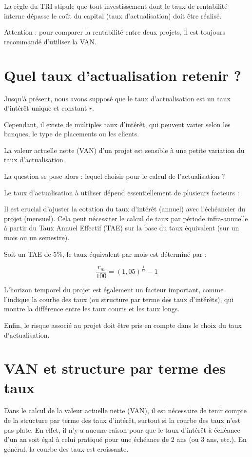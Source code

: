 \documentclass[a4paper, 12pt]{report}
\begin{document}
La règle du TRI stipule que tout investissement dont le taux de rentabilité interne dépasse le coût du capital (taux d'actualisation) doit être réalisé. 

Attention : pour comparer la rentabilité entre deux projets, il est toujours recommandé d'utiliser la VAN.

\section{Quel taux d'actualisation retenir ?}


Jusqu'à présent, nous avons supposé que le taux d'actualisation est un taux d'intérêt unique et constant \( r \).

Cependant, il existe de multiples taux d'intérêt, qui peuvent varier selon les banques, le type de placements ou les clients.


La valeur actuelle nette (VAN) d'un projet est sensible à une petite variation du taux d'actualisation.


La question se pose alors : lequel choisir pour le calcul de l'actualisation ?

Le taux d'actualisation à utiliser dépend essentiellement de plusieurs facteurs :

Il est crucial d'ajuster la cotation du taux d'intérêt (annuel) avec l'échéancier du projet (mensuel). Cela peut nécessiter le calcul de taux par période infra-annuelle à partir du Taux Annuel Effectif (TAE) sur la base du taux équivalent (sur un mois ou un semestre).

Soit un TAE de 5\%, le taux équivalent par mois est déterminé par :

\[
\frac{r_m}{100} = (1,05)^{\frac{1}{12}} - 1
\]

L'horizon temporel du projet est également un facteur important, comme l'indique la courbe des taux (ou structure par terme des taux d'intérêts), qui montre la différence entre les taux courts et les taux longs.

Enfin, le risque associé au projet doit être pris en compte dans le choix du taux d'actualisation.

\section{VAN  et structure par terme des taux}

Dans le calcul de la valeur actuelle nette (VAN), il est nécessaire de tenir compte de la structure par terme des taux d'intérêt, surtout si la courbe des taux n'est pas plate. En effet, il n'y a aucune raison pour que le taux d'intérêt à échéance d'un an soit égal à celui pratiqué pour une échéance de 2 ans (ou 3 ans, etc.). En général, la courbe des taux est croissante.
\end{document}

